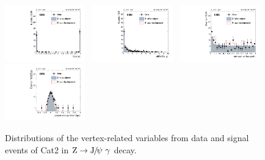 \begin{figure}[p]
		  \includegraphics[width=0.31\textwidth]{Fig/Final_NoPreliminary/ZJpsiG/CosAlpha_Norm_EBLR9}~
		  \includegraphics[width=0.31\textwidth]{Fig/Final_NoPreliminary/ZJpsiG/diMuChi2_Norm_EBLR9}~
		  \includegraphics[width=0.31\textwidth]{Fig/Final_NoPreliminary/ZJpsiG/VtxProb_Norm_EBLR9}\\
		  \includegraphics[width=0.31\textwidth]{Fig/Final_NoPreliminary/ZJpsiG/ctau_narrowAltBins_EBLR9}\\
		
		  \caption{Distributions of the vertex-related variables from data and signal events of Cat2 in $\cPZ\to\JPsi\ \gamma$ decay.}
		  \label{fig:vtx_zjpsig_cat2}
		\end{figure}
		\clearpage
		
